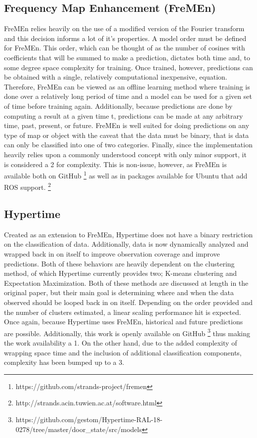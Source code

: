   \subsection { Frequency Map Enhancement (FreMEn) }
  FreMEn relies heavily on the use of a modified version of the Fourier
  transform and this decision informs a lot of it's properties. A model order must
  be defined for FreMEn. This order, which can be thought of as the number of
  cosines with coefficients that will be summed to make a prediction, dictates
  both time and, to some degree space complexity for training. Once trained,
  however, predictions can be obtained with a single, relatively computational
  inexpensive, equation. Therefore, FreMEn can be
  viewed as an offline learning method where training is done over a relatively
  long period of time and a model can be used for a given set of time before
  training again. Additionally, because predictions are done by computing a
  result at a given time t, predictions can be made at any arbitrary time,
  past, present, or future. FreMEn is well suited for doing predictions on any type
  of map or object with the caveat that the data must be binary, that is
  data can only be classified into one of two categories. Finally, since the
  implementation heavily relies upon a commonly understood concept with only
  minor support, it is considered a 2 for complexity. This is non-issue,
  however, as FreMEn is available both on
  GitHub \footnote[0]{https://github.com/strands-project/fremen}
  as well as in packages available for Ubuntu that add ROS
  support. \footnote[1]{http://strands.acin.tuwien.ac.at/software.html}


  \subsection { Hypertime }

  Created as an extension to FreMEn, Hypertime does not have a binary restriction
  on the classification of data. Additionally, data is now dynamically analyzed
  and wrapped back in on itself to improve observation coverage and improve
  predictions. Both of these behaviors are heavily dependent on the clustering
  method, of which Hypertime currently provides two; K-means clustering and
  Expectation Maximization. Both of these methods are discussed at length in
  the original paper, but their main goal is determining where and when the data observed
  should be looped back in on itself. Depending on the order provided and the
  number of clusters estimated, a linear scaling performance hit is expected.
  Once again, because Hypertime uses FreMEn, historical and future predictions
  are possible. Additionally, this work is openly available on GitHub
  \footnote[2]{https://github.com/gestom/Hypertime-RAL-18-0278/tree/master/door\_state/src/models}
  thus making the work availability a 1. On the other hand, due to the added
  complexity of wrapping space time and the inclusion of additional classification
  components, complexity has been bumped up to a 3. \\

